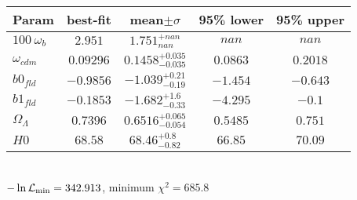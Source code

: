 \begin{tabular}{|l|c|c|c|c|} 
 \hline 
Param & best-fit & mean$\pm\sigma$ & 95\% lower & 95\% upper \\ \hline 
$100~\omega_{b }$ &$2.951$ & $1.751_{nan}^{+nan}$ & $nan$ & $nan$ \\ 
$\omega_{cdm }$ &$0.09296$ & $0.1458_{-0.035}^{+0.035}$ & $0.0863$ & $0.2018$ \\ 
$b0_{fld }$ &$-0.9856$ & $-1.039_{-0.19}^{+0.21}$ & $-1.454$ & $-0.643$ \\ 
$b1_{fld }$ &$-0.1853$ & $-1.682_{-0.33}^{+1.6}$ & $-4.295$ & $-0.1$ \\ 
$\Omega_{\Lambda }$ &$0.7396$ & $0.6516_{-0.054}^{+0.065}$ & $0.5485$ & $0.751$ \\ 
$H0$ &$68.58$ & $68.46_{-0.82}^{+0.8}$ & $66.85$ & $70.09$ \\ 
\hline 
 \end{tabular} \\ 
$-\ln{\cal L}_\mathrm{min} =342.913$, minimum $\chi^2=685.8$ \\ 
